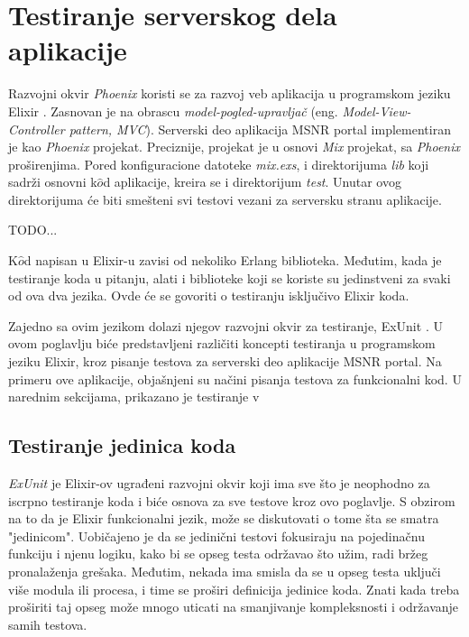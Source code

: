 \documentclass[12pt,oneside]{memoir}
\begin{document}
\chapter{Testiranje serverskog dela aplikacije}
\label{chp:elixir}

\par Razvojni okvir \emph{Phoenix} koristi se za razvoj veb aplikacija u programskom jeziku Elixir \cite{phx}. Zasnovan je na obrascu \emph{model-pogled-upravljač} (eng. \emph{Model-View-Controller pattern, MVC}). Serverski deo aplikacija MSNR portal implementiran je kao \emph{Phoenix} projekat. Preciznije, projekat je u osnovi \emph{Mix} projekat, sa \emph{Phoenix} proširenjima. Pored konfiguracione datoteke \emph{mix.exs}, i direktorijuma \emph{lib} koji sadrži osnovni k$\hat{o}$d aplikacije, kreira se i direktorijum \emph{test}. Unutar ovog direktorijuma će biti smešteni svi testovi vezani za serversku stranu aplikacije. 

\par  TODO...

\par K$\hat{o}$d napisan u Elixir-u zavisi od nekoliko Erlang biblioteka. Međutim, kada je testiranje koda u pitanju, alati i biblioteke koji se koriste su jedinstveni za svaki od ova dva jezika. Ovde će se govoriti o testiranju isključivo Elixir koda. 

\par Zajedno sa ovim jezikom dolazi njegov razvojni okvir za testiranje, ExUnit \cite{exunit}. U ovom poglavlju biće predstavljeni različiti koncepti testiranja u programskom jeziku Elixir, kroz pisanje testova za serverski deo aplikacije MSNR portal. Na primeru ove aplikacije, objašnjeni su načini pisanja testova za funkcionalni kod. U narednim sekcijama, prikazano je testiranje v

\section{Testiranje jedinica koda}
\label{sec:elixunit}

\textit{ExUnit} je Elixir-ov ugrađeni razvojni okvir koji ima sve što je neophodno za iscrpno testiranje koda i biće osnova za sve testove kroz ovo poglavlje. S obzirom na to da je Elixir funkcionalni jezik, može se diskutovati o tome šta se smatra "jedinicom". Uobičajeno je da se jedinični testovi fokusiraju na pojedinačnu funkciju i njenu logiku, kako bi se opseg testa održavao što užim, radi bržeg pronalaženja grešaka. Međutim, nekada ima smisla da se u opseg testa uključi više modula ili procesa, i time se proširi definicija jedinice koda. Znati kada treba proširiti taj opseg može mnogo uticati na smanjivanje kompleksnosti i održavanje samih testova. 
\end{document}
